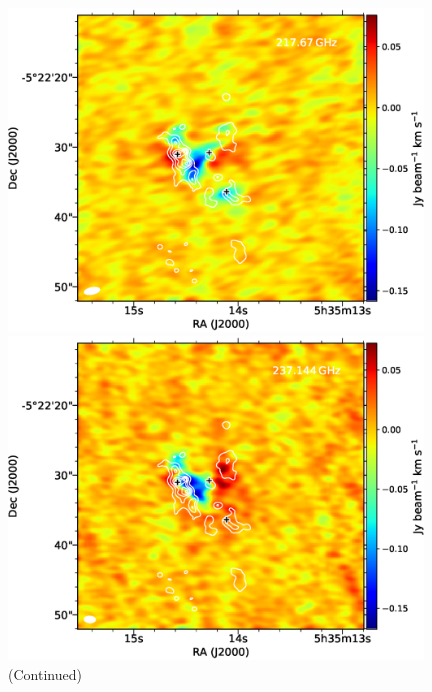 \begin{figure}[H]
\begin{center}
\begin{minipage}{0.98\textwidth} 
\begin{center}
\begin{minipage}{0.48\textwidth}
\begin{center}
\includegraphics[width=0.98\textwidth]{OrionKL/mom0/217.67mom0_3-7.eps}
\end{center}
\end{minipage}
\begin{minipage}{0.48\textwidth}
\begin{center}
\includegraphics[width=0.98\textwidth]{OrionKL/mom0/237.144mom0_3-7.eps}
\end{center}
\end{minipage}
\end{center}
\end{minipage}
\caption{(Continued)}
\end{center}
\end{figure}

